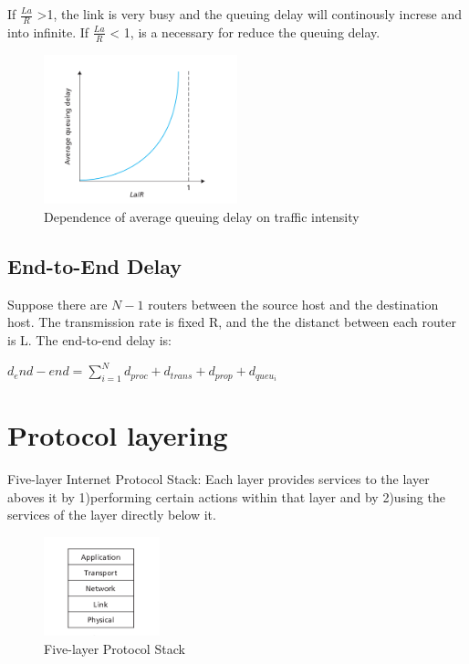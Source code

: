 If $\frac{La}{R}$ >1, the link is very busy and the queuing delay will continously increse and into infinite. If $\frac{La}{R}$ < 1, is a necessary
for reduce the queuing delay.

\begin{figure}[!h]
    \centering
    \includegraphics[width=0.5\textwidth]{chapters/chapter1/Queuing_delay.png}
    \caption{Dependence of average queuing delay on traffic intensity}
    \label{c1_queuingDelay_trafficIntensity}
\end{figure}


\subsection{End-to-End Delay}
Suppose there are $N-1$ routers between the source host and
the destination host. The transmission rate is fixed R, and the the distanct between each router is L.
The end-to-end delay is:
\begin{center}
    $d_end-end = \sum_{i=1}^N d_{proc}+d_{trans}+d_{prop}+d_{queu_i}$
\end{center}

\section{Protocol layering}

Five-layer Internet Protocol Stack: Each layer provides services to the layer aboves it by 1)performing certain actions within that layer and by
2)using the services of the layer directly below it.


\begin{figure}[!h]
    \centering
    \includegraphics[width=0.3\textwidth]{chapters/chapter1/Layered.png}
    \caption{Five-layer Protocol Stack}
    \label{c1_protocol_stack}
\end{figure}

